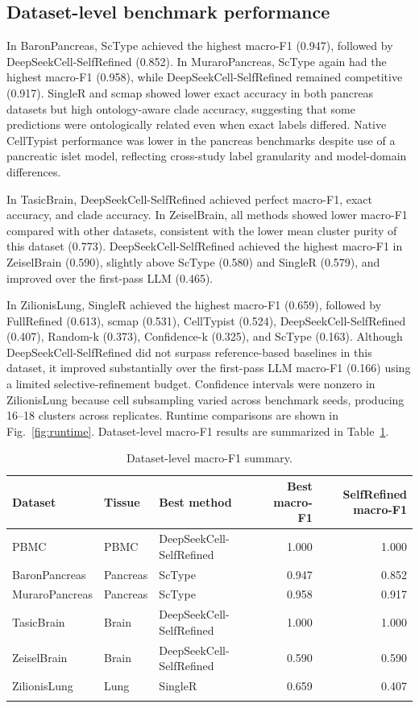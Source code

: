 \documentclass[referee,lineno,pdflatex]{sn-jnl}
\begin{document}
\subsection{Dataset-level benchmark performance}

In BaronPancreas, ScType achieved the highest macro-F1 (0.947), followed by DeepSeekCell-SelfRefined (0.852). In MuraroPancreas, ScType again had the highest macro-F1 (0.958), while DeepSeekCell-SelfRefined remained competitive (0.917). SingleR and scmap showed lower exact accuracy in both pancreas datasets but high ontology-aware clade accuracy, suggesting that some predictions were ontologically related even when exact labels differed. Native CellTypist performance was lower in the pancreas benchmarks despite use of a pancreatic islet model, reflecting cross-study label granularity and model-domain differences.

In TasicBrain, DeepSeekCell-SelfRefined achieved perfect macro-F1, exact accuracy, and clade accuracy. In ZeiselBrain, all methods showed lower macro-F1 compared with other datasets, consistent with the lower mean cluster purity of this dataset (0.773). DeepSeekCell-SelfRefined achieved the highest macro-F1 in ZeiselBrain (0.590), slightly above ScType (0.580) and SingleR (0.579), and improved over the first-pass LLM (0.465).

In ZilionisLung, SingleR achieved the highest macro-F1 (0.659), followed by FullRefined (0.613), scmap (0.531), CellTypist (0.524), DeepSeekCell-SelfRefined (0.407), Random-k (0.373), Confidence-k (0.325), and ScType (0.163). Although DeepSeekCell-SelfRefined did not surpass reference-based baselines in this dataset, it improved substantially over the first-pass LLM macro-F1 (0.166) using a limited selective-refinement budget. Confidence intervals were nonzero in ZilionisLung because cell subsampling varied across benchmark seeds, producing 16--18 clusters across replicates. Runtime comparisons are shown in Fig.~\ref{fig:runtime}. Dataset-level macro-F1 results are summarized in Table~\ref{tab:datasetlevel}.

\begin{table}[htp]
\caption{Dataset-level macro-F1 summary.}\label{tab:datasetlevel}
\small
\begin{tabularx}{\textwidth}{@{}llXrr@{}}
\toprule
Dataset & Tissue & Best method & Best macro-F1 & SelfRefined macro-F1\\
\midrule
PBMC & PBMC & DeepSeekCell-SelfRefined & 1.000 & 1.000\\
BaronPancreas & Pancreas & ScType & 0.947 & 0.852\\
MuraroPancreas & Pancreas & ScType & 0.958 & 0.917\\
TasicBrain & Brain & DeepSeekCell-SelfRefined & 1.000 & 1.000\\
ZeiselBrain & Brain & DeepSeekCell-SelfRefined & 0.590 & 0.590\\
ZilionisLung & Lung & SingleR & 0.659 & 0.407\\
\botrule
\end{tabularx}
\end{table}
\end{document}
